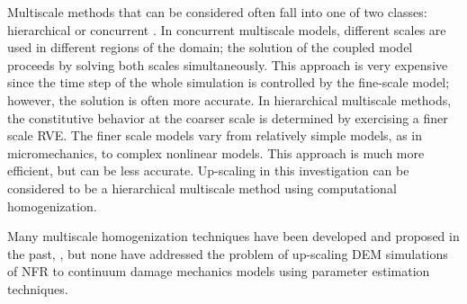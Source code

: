 Multiscale methods that can be considered often fall into one of two classes: hierarchical or concurrent \cite{Gracie_2011}. In concurrent multiscale models, different scales are used in different regions of the domain; the solution of the coupled model proceeds by solving both scales simultaneously. This approach is very expensive since the time step of the whole simulation is controlled by the fine-scale model; however, the solution is often more accurate. In hierarchical multiscale methods, the constitutive behavior at the coarser scale is determined by exercising a finer scale RVE. The finer scale models vary from relatively simple models, as in micromechanics, to complex nonlinear models. This approach is much more efficient, but can be less accurate. Up-scaling in this investigation can be considered to be a hierarchical multiscale method using computational homogenization. 

Many multiscale homogenization techniques have been developed and proposed in the past, \cite{Aanonsen_2006,Temizer_2009,Loehnert_2005}, but none have addressed the problem of up-scaling DEM simulations of  NFR to continuum damage mechanics models using parameter estimation techniques.
